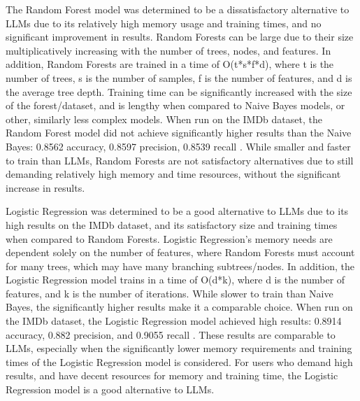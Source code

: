 \documentclass[10pt,twocolumn,letterpaper]{article}
\begin{document}
The Random Forest model was determined to be a dissatisfactory alternative to LLMs due to its relatively high memory usage and training times, and no significant improvement in results. Random Forests can be large due to their size multiplicatively increasing with the number of trees, nodes, and features. In addition, Random Forests are trained in a time of O(t*s*f*d), where t is the number of trees, s is the number of samples, f is the number of features, and d is the average tree depth. Training time can be significantly increased with the size of the forest/dataset, and is lengthy when compared to Naive Bayes models, or other, similarly less complex models. When run on the IMDb dataset, the Random Forest model did not achieve significantly higher results than the Naive Bayes: 0.8562 accuracy, 0.8597 precision, 0.8539 recall \cite{MLTechniques}. While smaller and faster to train than LLMs, Random Forests are not satisfactory alternatives due to still demanding relatively high memory and time resources, without the significant increase in results.

Logistic Regression was determined to be a good alternative to LLMs due to its high results on the IMDb dataset, and its satisfactory size and training times when compared to Random Forests. Logistic Regression’s memory needs are dependent solely on the number of features, where Random Forests must account for many trees, which may have many branching subtrees/nodes. In addition, the  Logistic Regression model trains in a time of O(d*k), where d is the number of features, and k is the number of iterations. While slower to train than Naive Bayes, the significantly higher results make it a comparable choice. When run on the IMDb dataset, the Logistic Regression model achieved high results: 0.8914 accuracy, 0.882 precision, and 0.9055 recall \cite{MLTechniques}. These results are comparable to LLMs, especially when the significantly lower memory requirements and training times of the Logistic Regression model is considered. For users who demand high results, and have decent resources for memory and training time, the Logistic Regression model is a good alternative to LLMs.
\end{document}
